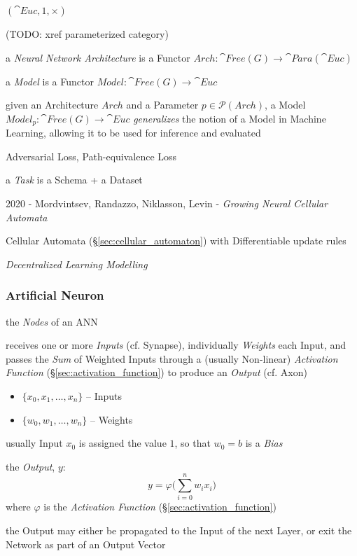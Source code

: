 $(\cat{Euc}, 1, \times)$

(TODO: xref parameterized category)

a \emph{Neural Network Architecture} is a Functor
$Arch : \cat{Free}(G) \to \cat{Para}(\cat{Euc})$

a \emph{Model} is a Functor $Model : \cat{Free}(G) \to \cat{Euc}$

given an Architecture $Arch$ and a Parameter $p \in \mathcal{P}(Arch)$, a Model
$Model_p : \cat{Free}(G) \to \cat{Euc}$ \emph{generalizes} the notion of
a Model in Machine Learning, allowing it to be used for inference and evaluated

Adversarial Loss, Path-equivalence Loss

a \emph{Task} is a Schema + a Dataset

\asterism

2020 - Mordvintsev, Randazzo, Niklasson, Levin - \emph{Growing Neural Cellular
  Automata}

Cellular Automata (\S\ref{sec:cellular_automaton}) with Differentiable update
rules

\emph{Decentralized Learning Modelling}



\subsubsection{Artificial Neuron}\label{sec:artificial_neuron}

the \emph{Nodes} of an ANN

receives one or more \emph{Inputs} (cf. Synapse), individually \emph{Weights}
each Input, and passes the \emph{Sum} of Weighted Inputs through a (usually
Non-linear) \emph{Activation Function} (\S\ref{sec:activation_function}) to
produce an \emph{Output} (cf. Axon)

\begin{itemize}
  \item $\{ x_0, x_1, \ldots, x_n \}$ -- Inputs
  \item $\{ w_0, w_1, \ldots, w_n \}$ -- Weights
\end{itemize}

usually Input $x_0$ is assigned the value $1$, so that $w_0 = b$ is a
\emph{Bias}

the \emph{Output}, $y$:
\[
  y = \varphi \Big( \sum_{i=0}^n w_i x_i \Big)
\]
where $\varphi$ is the \emph{Activation Function}
(\S\ref{sec:activation_function})

the Output may either be propagated to the Input of the next Layer, or exit the
Network as part of an Output Vector

